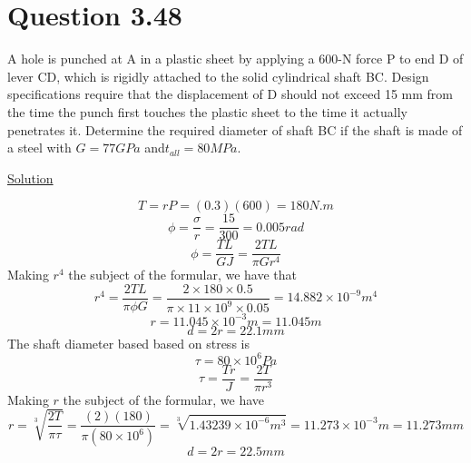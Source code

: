 \documentclass{article}
\begin{document}
\section*{Question 3.48}
A hole is punched at A in a plastic sheet by applying a 600-N force P to end D of lever CD, which is rigidly attached to the solid cylindrical shaft BC. Design specifications require that the displacement of D should not exceed 15 mm from the time the punch first touches the plastic sheet to the time it actually penetrates it. Determine the required diameter of shaft BC if the shaft is made of a steel with $G = 77 GPa$ and$ t_{all}= 80 MPa.$

\begin{center}\underline{Solution}\end{center}
\[T = rP = (0.3)(600) = 180N.m\]
\[\phi = \frac{\sigma}{r} = \frac{15}{300} = 0.005 rad\]
\[\phi = \frac{TL}{GJ} = \frac{2TL}{\pi Gr^{4}}\]
Making $r^{4}$ the subject of the formular, we have that
\[r^{4} = \frac{2TL}{\pi\phi G} = \frac{2\times180\times0.5}{\pi\times11\times10^{9}\times0.05} = 14.882\times10^{-9}m^{4}\]
\[r = 11.045\times10^{-3}m = 11.045m\]
\[d  =2r = 22.1mm\]
The shaft diameter based based on stress is
\[\tau = 80\times10^{6}Pa\]
\[\tau =\frac{Tr}{J}=\frac{2T}{\pi r^{3}}\]
Making $r$ the subject of the formular, we have
\[r = \sqrt[3]{\frac{2T}{\pi\tau} }= \frac{(2)(180)}{\pi(80\times10^{6})} = \sqrt[3]{1.43239\times10^{-6}m^{3}} = 11.273\times10^{-3}m = 11.273mm\]
\[d = 2r = 22.5mm\]
\end{document}
